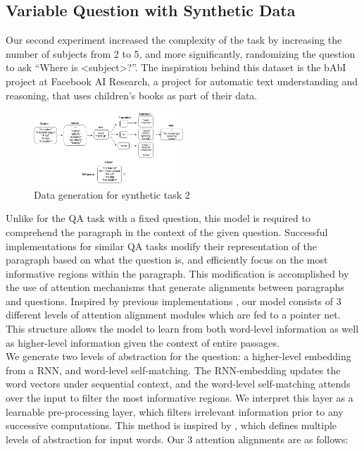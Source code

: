 \documentclass{article}
\begin{document}
\subsection{Variable Question with Synthetic Data}
Our second experiment increased the complexity of the task by increasing the number of subjects from 2 to 5, and more significantly, randomizing the question to ask ``Where is \textless subject\textgreater?''. The inspiration behind this dataset is the bAbI \cite{bAbI} project at Facebook AI Research, a project for automatic text understanding and reasoning, that uses children's books as part of their data. \\

\begin{figure}[h]
	\includegraphics[width=0.5\textwidth]{fake_data2.png}
	\centering
	\caption{Data generation for synthetic task 2}
	\label{fig:fakeData2}
\end{figure}

Unlike for the QA task with a fixed question, this model is required to comprehend the paragraph in the context of the given question. Successful implementations for similar QA tasks modify their representation of the paragraph based on what the question is, and efficiently focus on the most informative regions within the paragraph. This modification is accomplished by the use of attention mechanisms that generate alignments between paragraphs and questions. Inspired by previous implementations \cite{BiDAF}, our model consists of 3 different levels of attention alignment modules which are fed to a pointer net. This structure allows the model to learn from both word-level information as well as higher-level information given the context of entire passages. \\

We generate two levels of abstraction for the question: a higher-level embedding from a RNN, and word-level self-matching. The RNN-embedding updates the word vectors under sequential context, and the word-level self-matching attends over the input to filter the most informative regions. We interpret this layer as a learnable pre-processing layer, which filters irrelevant information prior to any successive computations. This method is inspired by \cite{FusionNet}, which defines multiple levels of abstraction for input words. Our 3 attention alignments are as follows:
\end{document}

